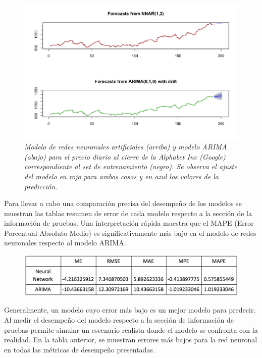 \documentclass[letterpaper,12pt, spanish, oneside]{book} %
\begin{document}
\begin{figure}[H]
\centering
\includegraphics[width=1\textwidth]{Google3.png}
\caption{\label{fig:frog2}\textit{Modelo de redes neuronales artificiales (arriba) y modelo ARIMA (abajo) para el precio diario al cierre de la Alphabet Inc (Google) correspondiente al set de entrenamiento (negro). Se observa el ajuste del modelo en rojo para ambos casos y en azul los valores de la predicción.
}}
\end{figure}

Para llevar a cabo una comparación precisa del desempeño de los modelos se muestran las tablas resumen de error de cada modelo respecto a la sección de la información de pruebas. Una interpretación rápida muestra que el MAPE (Error Porcentual Absoluto Medio) es significativamente más bajo en el modelo de redes neuronales respecto al modelo ARIMA.

\begin{figure}[H]
\centering
\includegraphics[width=1\textwidth]{google_performance.png}
\end{figure}

Generalmente, un modelo cuyo error más bajo es un mejor modelo para predecir. Al medir el desempeño del modelo respecto a la sección de información de pruebas permite simular un escenario realista donde el modelo se confronta con la realidad. En la tabla anterior, se muestran errores más bajos para la red neuronal en todas las métricas de desempeño presentadas.
\end{document}
